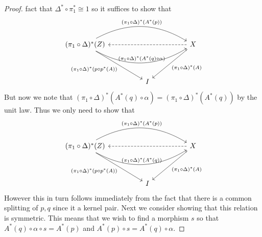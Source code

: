 \begin{proof}
  fact that $\Delta^* \circ \pi_1^* \cong 1$ so it suffices to show
  that
  \[
    \begin{tikzcd}
      (\pi_1 \circ \Delta)^*(Z)
      \ar[rrrr, bend left, "(\pi_1 \circ \Delta)^*(A^*(p))"]
      \ar[rrrr, bend right, "(\pi_1 \circ \Delta)^*(A^*(q) \circ \alpha)"]
      \ar[ddrr, swap, "(\pi_1 \circ \Delta)^*(p \circ p^*(A))"]
      &&&& X \ar[ddll, "(\pi_1 \circ \Delta)^*(A)"] \ar[llll, dashed]\\
      &&&&\\
      && I &&
    \end{tikzcd}
  \]
  But now we note that
  $(\pi_1 \circ \Delta)^*(A^*(q) \circ \alpha) = (\pi_1 \circ
  \Delta)^*(A^*(q))$ by the unit law. Thus we only need to show that
  \[
    \begin{tikzcd}
      (\pi_1 \circ \Delta)^*(Z)
      \ar[rrrr, bend left, "(\pi_1 \circ \Delta)^*(A^*(p))"]
      \ar[rrrr, bend right, "(\pi_1 \circ \Delta)^*(A^*(q))"]
      \ar[ddrr, swap, "(\pi_1 \circ \Delta)^*(p \circ p^*(A))"]
      &&&& X \ar[ddll, "(\pi_1 \circ \Delta)^*(A)"] \ar[llll, dashed]\\
      &&&&\\
      && I &&
    \end{tikzcd}
  \]
  However this in turn follows immediately from the fact that there is
  a common splitting of $p, q$ since it a kernel pair. Next we
  consider showing that this relation is symmetric. This means that we
  wish to find a morphism $s$ so that
  $A^*(q) \circ \alpha \circ s = A^*(p)$ and
  $A^*(p) \circ s = A^*(q) \circ \alpha$.



\end{proof}
